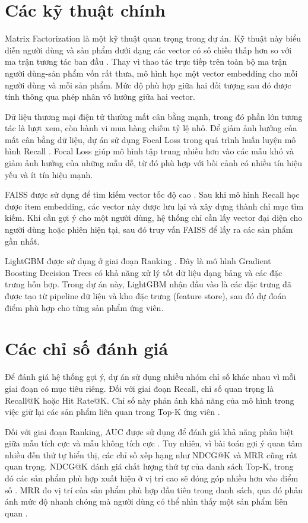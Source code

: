 \section{Các kỹ thuật chính}
Matrix Factorization là một kỹ thuật quan trọng trong dự án. Kỹ thuật này biểu diễn người dùng và sản phẩm dưới dạng các vector có số chiều thấp hơn so với ma trận tương tác ban đầu \cite{koren2009matrix}. Thay vì thao tác trực tiếp trên toàn bộ ma trận người dùng-sản phẩm vốn rất thưa, mô hình học một vector embedding cho mỗi người dùng và mỗi sản phẩm. Mức độ phù hợp giữa hai đối tượng sau đó được tính thông qua phép nhân vô hướng giữa hai vector.
\medskip

Dữ liệu thương mại điện tử thường mất cân bằng mạnh, trong đó phần lớn tương tác là lượt xem, còn hành vi mua hàng chiếm tỷ lệ nhỏ. Để giảm ảnh hưởng của mất cân bằng dữ liệu, dự án sử dụng Focal Loss trong quá trình huấn luyện mô hình Recall \cite{lin2017focal}. Focal Loss giúp mô hình tập trung nhiều hơn vào các mẫu khó và giảm ảnh hưởng của những mẫu dễ, từ đó phù hợp với bối cảnh có nhiều tín hiệu yếu và ít tín hiệu mạnh.
\medskip

FAISS được sử dụng để tìm kiếm vector tốc độ cao \cite{johnson2019billion}. Sau khi mô hình Recall học được item embedding, các vector này được lưu lại và xây dựng thành chỉ mục tìm kiếm. Khi cần gợi ý cho một người dùng, hệ thống chỉ cần lấy vector đại diện cho người dùng hoặc phiên hiện tại, sau đó truy vấn FAISS để lấy ra các sản phẩm gần nhất.
\medskip

LightGBM được sử dụng ở giai đoạn Ranking \cite{ke2017lightgbm}. Đây là mô hình Gradient Boosting Decision Trees có khả năng xử lý tốt dữ liệu dạng bảng và các đặc trưng hỗn hợp. Trong dự án này, LightGBM nhận đầu vào là các đặc trưng đã được tạo từ pipeline dữ liệu và kho đặc trưng (feature store), sau đó dự đoán điểm phù hợp cho từng sản phẩm ứng viên.

\section{Các chỉ số đánh giá}
Để đánh giá hệ thống gợi ý, dự án sử dụng nhiều nhóm chỉ số khác nhau vì mỗi giai đoạn có mục tiêu riêng. Đối với giai đoạn Recall, chỉ số quan trọng là Recall@K hoặc Hit Rate@K. Chỉ số này phản ánh khả năng của mô hình trong việc giữ lại các sản phẩm liên quan trong Top-K ứng viên \cite{covington2016deep}.
\medskip

Đối với giai đoạn Ranking, AUC được sử dụng để đánh giá khả năng phân biệt giữa mẫu tích cực và mẫu không tích cực \cite{fawcett2006roc}. Tuy nhiên, vì bài toán gợi ý quan tâm nhiều đến thứ tự hiển thị, các chỉ số xếp hạng như NDCG@K và MRR cũng rất quan trọng. NDCG@K đánh giá chất lượng thứ tự của danh sách Top-K, trong đó các sản phẩm phù hợp xuất hiện ở vị trí cao sẽ đóng góp nhiều hơn vào điểm số \cite{jarvelin2002cumulated}. MRR đo vị trí của sản phẩm phù hợp đầu tiên trong danh sách, qua đó phản ánh mức độ nhanh chóng mà người dùng có thể nhìn thấy một sản phẩm liên quan \cite{craswell2009mrr}.
\medskip

